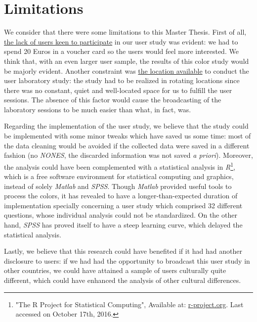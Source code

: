 \section{Limitations}
\label{sec:limitations}
%
We consider that there were some limitations to this Master Thesis. First of all, \ul{the lack of users keen to participate} in our user study was
evident: we had to spend 20 Euros in a voucher card so the users would feel more interested. We think that, with an even larger user sample, the results
of this color study would be majorly evident.
Another constraint was \ul{the location available} to conduct the user laboratory study: the study had to be realized in rotating locations since there was
no constant, quiet and well-located space for us to fulfill the user sessions. The absence of this factor would cause the broadcasting of the laboratory
sessions to be much easier than what, in fact, was. \par
%
Regarding the implementation of the user study, we believe that the study could be implemented with some minor tweaks which have saved us some time: most
of the data cleaning would be avoided if the collected data were saved in a different fashion (no \emph{NONES}, the discarded information was not saved
\emph{a priori}). Moreover, the analysis could have been complemented with a statistical analysis in \emph{R}\footnote{"The R Project for Statistical Computing", Available at:
\url{r-project.org}. Last accessed on October 17th, 2016.}, which is a free software environment for statistical computing and graphics, instead of solely
\emph{Matlab} and \emph{SPSS}. Though \emph{Matlab} provided useful tools to process the colors, it has revealed to have a longer-than-expected duration of implementation
specially concerning a user study which comprised 32 different questions, whose individual analysis could not be standardized. On the other hand, \emph{SPSS}
has proved itself to have a steep learning curve, which delayed the statistical analysis. \par
%
Lastly, we believe that this research could have benefited if it had had another disclosure to users: if we had had the opportunity to broadcast this user
study in other countries, we could have attained a sample of users culturally quite different, which could have enhanced the analysis of other cultural
differences.
%
